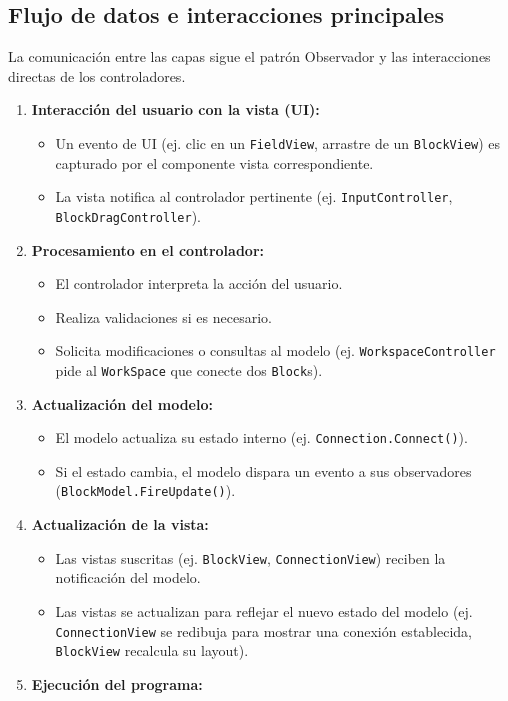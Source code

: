 \subsection{Flujo de datos e interacciones principales}
La comunicación entre las capas sigue el patrón Observador y las interacciones directas de los controladores.
\begin{enumerate}
	\item \textbf{Interacción del usuario con la vista (UI):}
	\begin{itemize}
		\item Un evento de UI (ej. clic en un \texttt{FieldView}, arrastre de un \texttt{BlockView}) es capturado por el componente vista correspondiente.
		\item La vista notifica al controlador pertinente (ej. \texttt{InputController}, \texttt{BlockDragController}).
	\end{itemize}
	\item \textbf{Procesamiento en el controlador:}
	\begin{itemize}
		\item El controlador interpreta la acción del usuario.
		\item Realiza validaciones si es necesario.
		\item Solicita modificaciones o consultas al modelo (ej. \texttt{WorkspaceController} pide al \texttt{WorkSpace} que conecte dos \texttt{Block}s).
	\end{itemize}
	\item \textbf{Actualización del modelo:}
	\begin{itemize}
		\item El modelo actualiza su estado interno (ej. \texttt{Connection.Connect()}).
		\item Si el estado cambia, el modelo dispara un evento a sus observadores (\texttt{BlockModel.FireUpdate()}).
	\end{itemize}
	\item \textbf{Actualización de la vista:}
	\begin{itemize}
		\item Las vistas suscritas (ej. \texttt{BlockView}, \texttt{ConnectionView}) reciben la notificación del modelo.
		\item Las vistas se actualizan para reflejar el nuevo estado del modelo (ej. \texttt{ConnectionView} se redibuja para mostrar una conexión establecida, \texttt{BlockView} recalcula su layout).
	\end{itemize}
	\item \textbf{Ejecución del programa:}

\end{enumerate}
